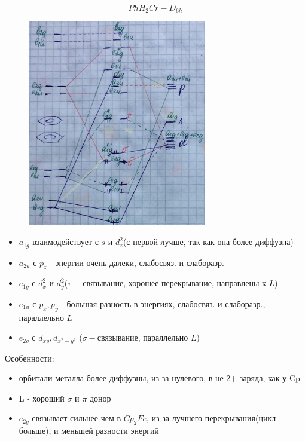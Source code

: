 
$$PhH_2Cr - D_{6h}$$

\begin{figure}[htp]
\centering
\includegraphics[scale=1.00]{images/DBCrome.png}
\end{figure}

\begin{itemize}
\item $a_{1g}$ взаимодействует с $s$ и $d_z^2$(с первой лучше, так как она более диффузна)
\item $a_{2u}$ с $p_z$ - энергии очень далеки, слабосвяз. и слаборазр.
\item $e_{1g}$ с $d_x^2$ и $d_y^2$($\pi-$связывание, хорошее перекрывание, направлены к $L$)
\item $e_{1u}$ с $p_x, p_y$ - большая разность в энергиях, слабосвяз. и слаборазр., параллельно $L$
\item $e_{2g}$ с $d_{xy}, d_{x^2-y^2}$ ($\sigma-$связывание, параллельно $L$)
\end{itemize}
Особенности:
\begin{itemize}
\item орбитали металла более диффузны, из-за нулевого, в не 2+ заряда, как у Cp
\item L - хороший $\sigma$ и $\pi$ донор
\item $e_{2g}$ связывает сильнее чем в $Cp_2Fe$, из-за лучшего перекрывания(цикл больше), и меньшей разности энергий
\end{itemize}